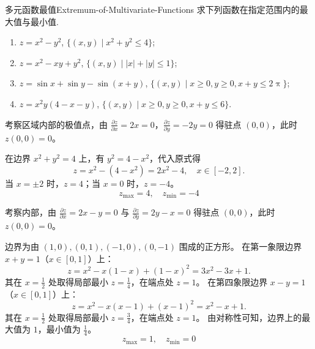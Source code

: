 \begin{problem}{多元函数最值}{Extremum-of-Multivariate-Functions}
    求下列函数在指定范围内的最大值与最小值.
    \begin{enumerate}
        \item $z = x^2 - y^2$, $\{(x, y) \mid x^2 + y^2 \le 4\}$;
        \item $z = x^2 - xy + y^2$, $\{(x, y) \mid |x| + |y| \le 1\}$;
        \item $z = \sin x + \sin y - \sin(x + y)$, $\{(x, y) \mid x \ge 0, y \ge 0, x + y \le 2 \uppi\}$;
        \item $z = x^2 y(4 - x - y)$, $\{(x, y) \mid x \ge 0, y \ge 0, x + y \le 6\}$.
    \end{enumerate}
\end{problem}

\begin{solution}
    考察区域内部的极值点，由 $\frac{\partial z}{\partial x} = 2x = 0$，$\frac{\partial z}{\partial y} = -2y = 0$ 得驻点 $(0, 0)$，此时 $z(0, 0) = 0$。

    在边界 $x^2 + y^2 = 4$ 上，有 $y^2 = 4 - x^2$，代入原式得
    \begin{equation}
        z = x^2 - (4 - x^2) = 2x^2 - 4, \quad x \in [-2, 2].
    \end{equation}
    当 $x = \pm 2$ 时，$z = 4$；当 $x = 0$ 时，$z = -4$。
    \begin{equation}
        \boxed{z_{\max} = 4, \quad z_{\min} = -4}
    \end{equation}

    考察内部，由 $\frac{\partial z}{\partial x} = 2x - y = 0$ 与 $\frac{\partial z}{\partial y} = 2y - x = 0$ 得驻点 $(0, 0)$，此时 $z(0, 0) = 0$。

    边界为由 $(1, 0), (0, 1), (-1, 0), (0, -1)$ 围成的正方形。
    在第一象限边界 $x + y = 1$（$x \in [0, 1]$）上：
    \begin{equation}
        z = x^2 - x(1 - x) + (1 - x)^2 = 3x^2 - 3x + 1.
    \end{equation}
    其在 $x = \frac{1}{2}$ 处取得局部最小 $z = \frac{1}{4}$，在端点处 $z = 1$。
    在第四象限边界 $x - y = 1$（$x \in [0, 1]$）上：
    \begin{equation}
        z = x^2 - x(x - 1) + (x - 1)^2 = x^2 - x + 1.
    \end{equation}
    其在 $x = \frac{1}{2}$ 处取得局部最小 $z = \frac{3}{4}$，在端点处 $z = 1$。
    由对称性可知，边界上的最大值为 $1$，最小值为 $\frac{1}{4}$。
    \begin{equation}
        \boxed{z_{\max} = 1, \quad z_{\min} = 0}
    \end{equation}


\end{solution}
